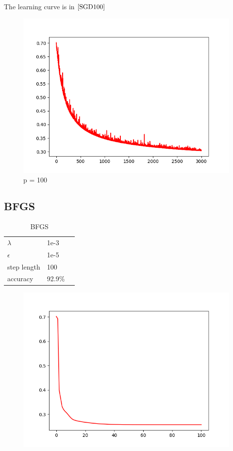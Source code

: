 \documentclass[a4paper,12pt]{article}
\begin{document}
The learning curve is in $\ref{SGD100}$
  \begin{figure}[htbp]
    \centering
    \includegraphics[width = .8\textwidth]{SGD100}
    \caption{p = 100}
    \label{SGD100}
\end{figure}

\subsection{BFGS}
\begin{table}[htbp]
    \caption{BFGS}
    \label{BFGS-table}
    \centering
    \begin{tabular}{lll}
      $\lambda$     &  1e-3 \\
      $\epsilon$     &  1e-5     \\
      step length     &   100 \\
      accuracy & 92.9\% 
    \end{tabular}
  \end{table}

\begin{figure}[htbp]
    \centering
    \includegraphics[width = .8\textwidth]{BFGS2}
    \caption{}
    \label{BFGS2}
\end{figure}
\end{document}
